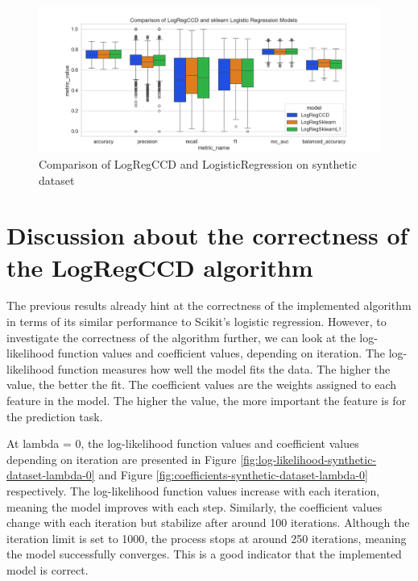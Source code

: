 \documentclass[11pt]{article}
\begin{document}
\begin{figure}[h]
    \centering
  \includegraphics[width=\textwidth]{../results/comparison-synthetic-dataset.png}
    \caption{Comparison of LogRegCCD and LogisticRegression on synthetic dataset}
    \label{fig:comparison-synthetic-dataset}
  \end{figure}



\section{Discussion about the correctness of the LogRegCCD algorithm}

The previous results already hint at the correctness of the implemented algorithm in terms of its similar performance to Scikit's logistic regression. However, to investigate the correctness of the algorithm further, we can look at the log-likelihood function values and coefficient values, depending on iteration. The log-likelihood function measures how well the model fits the data. The higher the value, the better the fit. The coefficient values are the weights assigned to each feature in the model. The higher the value, the more important the feature is for the prediction task. \par

At lambda = 0, the log-likelihood function values and coefficient values depending on iteration are presented in Figure \ref{fig:log-likelihood-synthetic-dataset-lambda-0} and Figure \ref{fig:coefficients-synthetic-dataset-lambda-0} respectively. The log-likelihood function values increase with each iteration, meaning the model improves with each step. Similarly, the coefficient values change with each iteration but stabilize after around 100 iterations. Although the iteration limit is set to 1000, the process stops at around 250 iterations, meaning the model successfully converges. This is a good indicator that the implemented model is correct.\par
\end{document}
